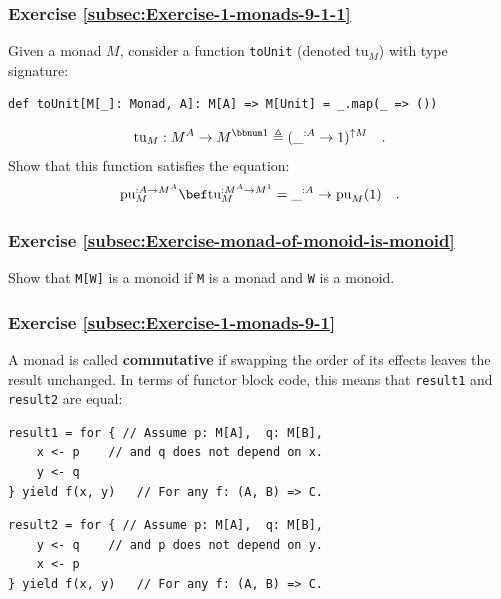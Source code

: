 \subsubsection{Exercise \label{subsec:Exercise-1-monads-9-1-1}\ref{subsec:Exercise-1-monads-9-1-1}}

Given a monad $M$, consider a function \lstinline!toUnit! (denoted
$\text{tu}_{M}$) with type signature:
\begin{lstlisting}
def toUnit[M[_]: Monad, A]: M[A] => M[Unit] = _.map(_ => ())
\end{lstlisting}
\[
\text{tu}_{M}:M^{A}\rightarrow M^{\bbnum 1}\triangleq(\_^{:A}\rightarrow1)^{\uparrow M}\quad.
\]
Show that this function satisfies the equation:
\[
\text{pu}_{M}^{:A\rightarrow M^{A}}\bef\text{tu}_{M}^{:M^{A}\rightarrow M^{1}}=\_^{:A}\rightarrow\text{pu}_{M}(1)\quad.
\]


\subsubsection{Exercise \label{subsec:Exercise-monad-of-monoid-is-monoid}\ref{subsec:Exercise-monad-of-monoid-is-monoid}}

Show that \lstinline!M[W]! is a monoid if \lstinline!M! is a monad
and \lstinline!W! is a monoid.

\subsubsection{Exercise \label{subsec:Exercise-1-monads-9-1}\ref{subsec:Exercise-1-monads-9-1}}

A monad is called \textbf{commutative}
if swapping the order of its effects leaves the result unchanged.
In terms of functor block code, this means that \lstinline!result1!
and \lstinline!result2! are equal:

\noindent \texttt{\textcolor{blue}{\footnotesize{}}}%
\begin{minipage}[c]{0.475\columnwidth}%
\texttt{\textcolor{blue}{\footnotesize{}}}
\begin{lstlisting}
result1 = for { // Assume p: M[A],  q: M[B],
    x <- p    // and q does not depend on x.
    y <- q
} yield f(x, y)   // For any f: (A, B) => C.
\end{lstlisting}
%
\end{minipage}\texttt{\textcolor{blue}{\footnotesize{}\hspace*{\fill}}}%
\begin{minipage}[c]{0.475\columnwidth}%
\texttt{\textcolor{blue}{\footnotesize{}}}
\begin{lstlisting}
result2 = for { // Assume p: M[A],  q: M[B],
    y <- q    // and p does not depend on y.
    x <- p
} yield f(x, y)   // For any f: (A, B) => C.
\end{lstlisting}
%
\end{minipage}{\footnotesize\par}

